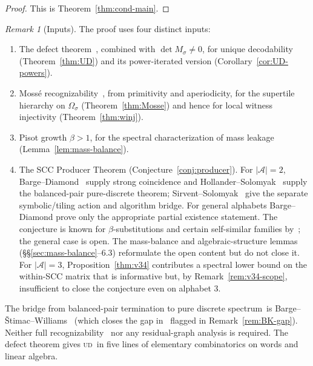 \documentclass[11pt]{article}
\theoremstyle{plain}
\theoremstyle{definition}
\theoremstyle{remark}
\newtheorem{remark}[theorem]{Remark}
\newcommand{\UD}{\textsc{ud}}
\newcommand{\PDS}{pure discrete spectrum}
\newcommand{\A}{\mathcal{A}}
\begin{document}
\begin{proof}
This is Theorem~\ref{thm:cond-main}.
\end{proof}

\begin{remark}[Inputs]\label{rem:inputs}
The proof uses four distinct inputs:
\begin{enumerate}[label=(\roman*)]
\item The defect theorem~\cite{BPPR}, combined with $\det M_\sigma\ne 0$, for unique decodability (Theorem~\ref{thm:UD}) and its power-iterated version (Corollary~\ref{cor:UD-powers}).
\item Moss\'e recognizability~\cite{Mosse1,Mosse2}, from primitivity and aperiodicity, for the supertile hierarchy on $\Omega_\sigma$ (Theorem~\ref{thm:Mosse}) and hence for local witness injectivity (Theorem~\ref{thm:winj}).
\item Pisot growth $\beta>1$, for the spectral characterization of mass leakage (Lemma~\ref{lem:mass-balance}).
\item The SCC Producer Theorem (Conjecture~\ref{conj:producer}). For $|\A|=2$, Barge--Diamond~\cite{BD} supply strong coincidence and Hollander--Solomyak~\cite{HS} supply the balanced-pair pure-discrete theorem; Sirvent--Solomyak~\cite{SS} give the separate symbolic/tiling action and algorithm bridge. For general alphabets Barge--Diamond prove only the appropriate partial existence statement. The conjecture is known for $\beta$-substitutions and certain self-similar families by~\cite{Barge2018,AL}; the general case is open. The mass-balance and algebraic-structure lemmas (\S\S\ref{sec:mass-balance}--6.3) reformulate the open content but do not close it. For $|\A|=3$, Proposition~\ref{thm:v34} contributes a spectral lower bound on the within-SCC matrix that is informative but, by Remark~\ref{rem:v34-scope}, insufficient to close the conjecture even on alphabet 3.
\end{enumerate}
The bridge from balanced-pair termination to \PDS\ is Barge--\v{S}timac--Williams~\cite{BSW} (which closes the gap in~\cite{BK} flagged in Remark~\ref{rem:BK-gap}). Neither full recognizability~\cite{BSTY} nor any residual-graph analysis is required. The defect theorem gives \UD\ in five lines of elementary combinatorics on words and linear algebra.
\end{remark}
\end{document}
